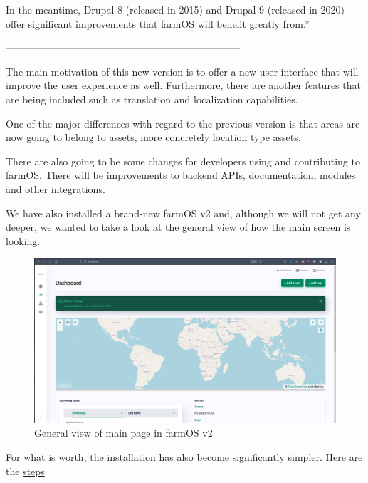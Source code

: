 In the meantime, Drupal 8 (released in 2015) and Drupal 9 (released in 2020) offer significant improvements that farmOS will benefit greatly from.''

-----------------------------------------------------------------------
\vspace{3mm}

The main motivation\cite{farmosv2} of this new version is to offer a new user interface that will improve the user experience as well. Furthermore, there are another features that are being included such as translation and localization capabilities.

One of the major differences with regard to the previous version is that areas are now going to belong to assets, more concretely location type assets.

There are also going to be some changes for developers using and contributing to farmOS. There will be improvements to backend APIs, documentation, modules and other integrations.

We have also installed a brand-new farmOS v2 and, although we will not get any deeper, we wanted to take a look at the general view of how the main screen is looking.

\vspace{3mm}

\begin{figure}[H]
    \centering
    \includegraphics[width=1.07\textwidth]{fig/brandnew-farmosv2.png}
    \caption{General view of main page in farmOS v2}
    \label{fig:brandnew-farmosv2}
\end{figure}

\vspace{3mm}

For what is worth, the installation has also become significantly simpler. Here are the \href{https://docs.farmos.org/development/environment/}{steps}

